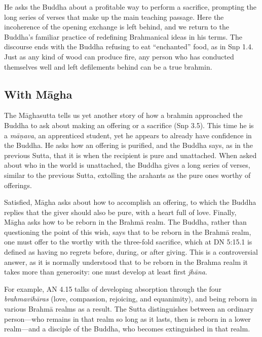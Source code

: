 \documentclass[12pt,openany]{book}%
\begin{document}
He asks the Buddha about a profitable way to perform a sacrifice, prompting the long series of verses that make up the main teaching passage. Here the incoherence of the opening exchange is left behind, and we return to the Buddha’s familiar practice of redefining Brahmanical ideas in his terms. The discourse ends with the Buddha refusing to eat “enchanted” food, as in Snp 1.4. Just as any kind of wood can produce fire, any person who has conducted themselves well and left defilements behind can be a true brahmin.

\subsection*{With \textsanskrit{Māgha}}

The \textsanskrit{Māghasutta} tells us yet another story of how a brahmin approached the Buddha to ask about making an offering or a sacrifice (Snp 3.5). This time he is a \textit{\textsanskrit{māṇava}}, an apprenticed student, yet he appears to already have confidence in the Buddha. He asks how an offering is purified, and the Buddha says, as in the previous Sutta, that it is when the recipient is pure and unattached. When asked about who in the world is unattached, the Buddha gives a long series of verses, similar to the previous Sutta, extolling the arahants as the pure ones worthy of offerings.

Satisfied, \textsanskrit{Māgha} asks about how to accomplish an offering, to which the Buddha replies that the giver should also be pure, with a heart full of love. Finally, \textsanskrit{Māgha} asks how to be reborn in the \textsanskrit{Brahmā} realm. The Buddha, rather than questioning the point of this wish, says that to be reborn in the \textsanskrit{Brahmā} realm, one must offer to the worthy with the three-fold sacrifice, which at DN 5:15.1 is defined as having no regrets before, during, or after giving. This is a controversial answer, as it is normally understood that to be reborn in the Brahma realm it takes more than generosity: one must develop at least first \textit{\textsanskrit{jhāna}}.

For example, AN 4.15 talks of developing absorption through the four \textit{\textsanskrit{brahmavihāras}} (love, compassion, rejoicing, and equanimity), and being reborn in various \textsanskrit{Brahmā} realms as a result. The Sutta distinguishes between an ordinary person—who remains in that realm so long as it lasts, then is reborn in a lower realm—and a disciple of the Buddha, who becomes extinguished in that realm.
\end{document}
